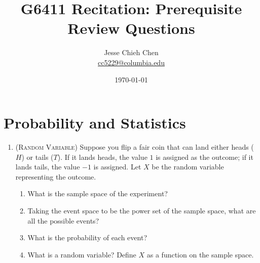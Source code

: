 \documentclass[letterpaper,12pt]{article}
\title{G6411 Recitation: Prerequisite Review Questions}
\author{Jesse Chieh Chen\\\href{mailto:cc5229@columbia.edu}{cc5229@columbia.edu}}
\date{\today}
\begin{document}
\maketitle

\section{Probability and Statistics}

\begin{enumerate}
	\item(\textsc{Random Variable})
		Suppose you flip a fair coin that can land either heads ($H$) or tails ($T$).
		If it lands heads, the value $1$ is assigned as the outcome;
		if it lands tails, the value $-1$ is assigned.
		Let $X$ be the random variable representing the outcome.
		\begin{enumerate}
			\item
				What is the sample space of the experiment?
			\item
				Taking the event space to be the power set of the sample space,
				what are all the possible events?
			\item
				What is the probability of each event?
			\item
				What is a random variable?
				Define $X$ as a function on the sample space.
		\end{enumerate}


\end{enumerate}
\end{document}
